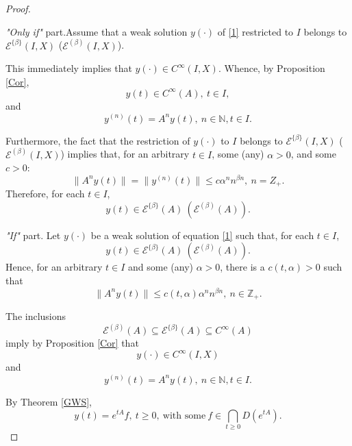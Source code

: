 \documentclass{amsart}
\theoremstyle{plain}
\theoremstyle{definition}
\begin{document}
\begin{proof}\ 

\textit{"Only if"} part.\quad Assume that a weak solution $y(\cdot)$ of \eqref{1} restricted to $I$ belongs to ${\mathscr E}^{\{\beta\}}(I,X)$ (${\mathscr E}^{(\beta)}(I,X)$).

This immediately implies that $y(\cdot)\in C^\infty(I,X)$. Whence, by Proposition \ref{Cor},
\[
y(t)\in C^\infty(A),\ t\in I,
\]
and
\[
y^{(n)}(t)=A^ny(t),\ n\in {{\mathbb N}},t\in I.
\]

Furthermore, the fact that the restriction of $y(\cdot)$ to $I$ belongs to ${\mathscr E}^{\{\beta\}}(I,X)$ (${\mathscr E}^{(\beta)}(I,X)$)
implies that, for an arbitrary $t\in I$, some (any) $\alpha>0$, and some $c>0$:
\begin{equation*}
\|A^ny(t)\|=\|y^{(n)}(t)\|\le c\alpha^nn^{\beta n},\ n=Z_+.
\end{equation*}
Therefore, for each $t\in I$,
\begin{equation*}
y(t) \in {\mathscr E}^{\{\beta\}}(A)\ ({\mathscr E}^{(\beta)}(A)).
\end{equation*}

\medskip
\textit{"If"} part.\quad
Let $y(\cdot)$ be a weak solution of equation \eqref{1} such that, for each $t\in I$,
\begin{equation*}
y(t) \in {\mathscr E}^{\{\beta\}}(A)\ ({\mathscr E}^{(\beta)}(A)).
\end{equation*}
Hence, for an arbitrary $t\in I$ and some (any) $\alpha>0$, 
there is a $c(t,\alpha)>0$ such that
\begin{equation}\label{const}
\|A^ny(t)\|\le c(t,\alpha)\alpha^nn^{\beta n},\ n\in {{\mathbb Z}}_+.
\end{equation}

The inclusions
\begin{equation*}
{\mathscr E}^{(\beta)}(A)\subseteq
{\mathscr E}^{\{\beta\}}(A)\subseteq C^\infty(A)
\end{equation*}
imply by Proposition \ref{Cor} that 
\[
y(\cdot)\in C^\infty(I,X)
\]
and
\[
y^{(n)}(t)=A^ny(t),\ n\in {{\mathbb N}},t\in I.
\]

By Theorem \ref{GWS},
\begin{equation*}
y(t)=e^{tA}f,\ t\ge 0,\ \text{with some}\
f \in \bigcap\limits_{t\ge 0} D(e^{tA}).
\end{equation*}


\end{proof}
\end{document}
